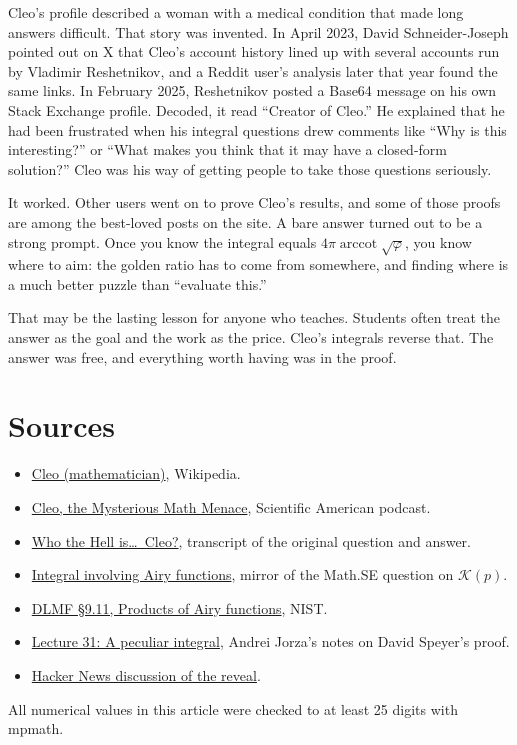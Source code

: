 \documentclass[11pt]{article}
\DeclareMathOperator{\arccot}{arccot}
\begin{document}
Cleo's profile described a woman with a medical condition that made long answers difficult. That story was invented. In April 2023, David Schneider-Joseph pointed out on X that Cleo's account history lined up with several accounts run by Vladimir Reshetnikov, and a Reddit user's analysis later that year found the same links. In February 2025, Reshetnikov posted a Base64 message on his own Stack Exchange profile. Decoded, it read ``Creator of Cleo.'' He explained that he had been frustrated when his integral questions drew comments like ``Why is this interesting?'' or ``What makes you think that it may have a closed-form solution?'' Cleo was his way of getting people to take those questions seriously.

It worked. Other users went on to prove Cleo's results, and some of those proofs are among the best-loved posts on the site. A bare answer turned out to be a strong prompt. Once you know the integral equals $4\pi\arccot\sqrt{\varphi}$, you know where to aim: the golden ratio has to come from somewhere, and finding where is a much better puzzle than ``evaluate this.''

That may be the lasting lesson for anyone who teaches. Students often treat the answer as the goal and the work as the price. Cleo's integrals reverse that. The answer was free, and everything worth having was in the proof.

\section*{Sources}

\begin{itemize}[leftmargin=*]
\item \href{https://en.wikipedia.org/wiki/Cleo_(mathematician)}{Cleo (mathematician)}, Wikipedia.
\item \href{https://www.scientificamerican.com/podcast/episode/cleo-the-mysterious-math-menace/}{Cleo, the Mysterious Math Menace}, Scientific American podcast.
\item \href{https://www.planksip.org/who-the-hell-is-cleo/}{Who the Hell is\ldots\ Cleo?}, transcript of the original question and answer.
\item \href{https://mathstx.blogspot.com/2016/06/calculus-integral-involving-airy.html}{Integral involving Airy functions}, mirror of the Math.SE question on $\mathcal K(p)$.
\item \href{https://dlmf.nist.gov/9.11}{DLMF \S9.11, Products of Airy functions}, NIST.
\item \href{https://www3.nd.edu/~ajorza/courses/2014s-m80220/notes/lecture31.pdf}{Lecture 31: A peculiar integral}, Andrei Jorza's notes on David Speyer's proof.
\item \href{https://news.ycombinator.com/item?id=50002332}{Hacker News discussion of the reveal}.
\end{itemize}

\noindent All numerical values in this article were checked to at least 25 digits with mpmath.
\end{document}
